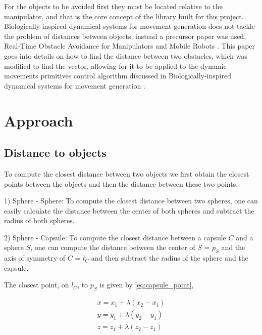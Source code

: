 \documentclass[a4paper, 10pt, conference]{ieeeconf}      %
\begin{document}

For the objects to be avoided first they must be located relative to the manipulator, and that is the core concept of the library built for this project. Biologically-inspired dynamical systems for movement generation \cite{Hoffmann} does not tackle the problem of distances between objects, instead a precursor paper was used, Real-Time Obstacle Avoidance for Manipulators and Mobile Robots \cite{Khatib}. This paper goes into details on how to find the distance between two obstacles, which was modified to find the vector, allowing for it to be applied to the dynamic movements primitives control algorithm discussed in Biologically-inspired dynamical systems for movement generation \cite{Hoffmann}.

\section{Approach}

\subsection{Distance to objects} %
To compute the closest distance between two objects we first obtain the closest points between the objects and then the distance between these two points.

1) Sphere - Sphere: 
To compute the closest distance between two spheres, one can easily calculate the distance between the center of both spheres and subtract the radius of both spheres.

2) Sphere - Capsule:
To compute the closest distance between a capsule $C$ and a sphere $S$, one can compute the distance between the center of $S$ = $p_S$ and the axis of symmetry of $C$ = $l_C$
and then subtract the radius of the sphere and the capsule. 

The closest point, on $l_C$, to $p_S$ is given by \eqref{eq:capsule_point},

\begin{equation}       
    \begin{matrix} 
        x = x_1 + \lambda(x_2 - x_1) \\
        y = y_1 + \lambda(y_2 - y_1) \\
        z = z_1 + \lambda(z_2 - z_1) \label{eq:capsule_point}
    \end{matrix}
\end{equation}
\end{document}
